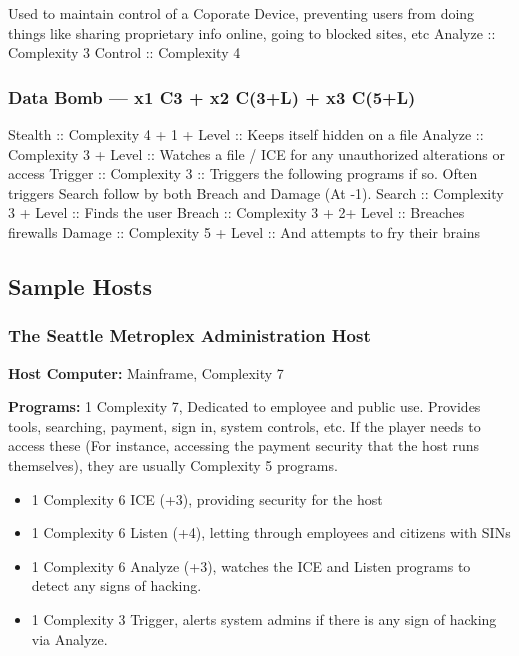 \begin{multicols}{2}
	Used to maintain control of a Coporate Device, preventing users from doing things like sharing proprietary info online, going to blocked sites, etc
	Analyze :: Complexity 3
	Control :: Complexity 4
	
	\subsubsection{Data Bomb — x1 C3 + x2 C(3+L) + x3 C(5+L)}
	
	Stealth :: Complexity 4 + 1 + Level :: Keeps itself hidden on a file
	Analyze :: Complexity 3 + Level :: Watches a file / ICE for any unauthorized alterations or access
	Trigger :: Complexity 3 :: Triggers the following programs if so. Often triggers Search follow by both Breach and Damage (At -1).
	Search :: Complexity 3 + Level :: Finds the user
	Breach :: Complexity 3 + 2+ Level :: Breaches firewalls
	Damage :: Complexity 5 + Level :: And attempts to fry their brains

	
	\subsection{Sample Hosts}
	
	\subsubsection{The Seattle Metroplex Administration Host}
	
	\hspace{\parindent}\textbf{Host Computer:} Mainframe, Complexity 7
	
	\textbf{Programs:}
	1 Complexity 7, Dedicated to employee and public use. Provides tools, searching, payment, sign in, system controls, etc. If the player needs to access these (For instance, accessing the payment security that the host runs themselves), they are usually Complexity 5 programs.
	
	\begin{itemize}
		\itemsep 0pt
		\item 1 Complexity 6 ICE (+3), providing security for the host
		\item 1 Complexity 6 Listen (+4), letting through employees and citizens with SINs
		\item 1 Complexity 6 Analyze (+3), watches the ICE and Listen programs to detect any signs of hacking.
		\item 1 Complexity 3 Trigger, alerts system admins if there is any sign of hacking via Analyze.
	\end{itemize}


\end{multicols}
